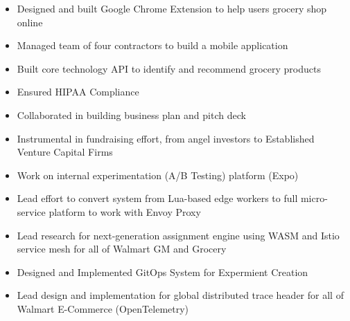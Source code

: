 \documentclass[10pt,a4paper,ragged2e]{altacv}
\begin{document}

\begin{fullwidth}
\makecvheader
\end{fullwidth}



\begin{itemize}
\item Designed and built Google Chrome Extension to help users grocery shop online
\item Managed team of four contractors to build a mobile application
\item Built core technology API to identify and recommend grocery products
\item Ensured HIPAA Compliance
\item Collaborated in building business plan and pitch deck
\item Instrumental in fundraising effort, from angel investors to Established Venture Capital Firms
\end{itemize}

\divider

\begin{itemize}
\item Work on internal experimentation (A/B Testing) platform (Expo)
\item Lead effort to convert system from Lua-based edge workers to full micro-service platform to work with Envoy Proxy
\item Lead research for next-generation assignment engine using WASM and Istio service mesh for all of Walmart GM and Grocery
\item Designed and Implemented GitOps System for Expermient Creation
\item Lead design and implementation for global distributed trace header for all of Walmart E-Commerce (OpenTelemetry)
\end{itemize}
\end{document}
